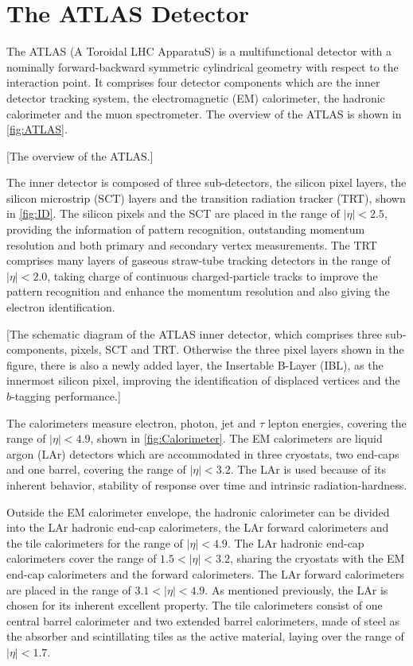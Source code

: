 \documentclass[class=NTHU_thesis, crop=false]{standalone}
\begin{document}
\chapter{The ATLAS Detector}
The ATLAS (A Toroidal LHC ApparatuS)\cite{1748-0221-3-08-S08003} is a multifunctional detector with a nominally forward-backward symmetric cylindrical geometry with respect to the interaction point. It comprises four detector components which are the inner detector tracking system, the electromagnetic (EM) calorimeter, the hadronic calorimeter and the muon spectrometer. The overview of the ATLAS is shown in \cref{fig:ATLAS}.

[The overview of the ATLAS.]

The inner detector is composed of three sub-detectors, the silicon pixel layers, the silicon microstrip (SCT) layers and the transition radiation tracker (TRT), shown in \cref{fig:ID}. The silicon pixels and the SCT are placed in the range of $\left|\eta\right| < 2.5$, providing the information of pattern recognition, outstanding momentum resolution and both primary and secondary vertex measurements. The TRT comprises many layers of gaseous straw-tube tracking detectors in the range of $\left|\eta\right| < 2.0$, taking charge of continuous charged-particle tracks to improve the pattern recognition and enhance the momentum resolution and also giving the electron identification.

[The schematic diagram of the ATLAS inner detector, which comprises three sub-components, pixels, SCT and TRT. Otherwise the three pixel layers shown in the figure, there is also a newly added layer, the Insertable B-Layer (IBL)\cite{Capeans:1291633}\cite{CERN-LHCC-2012-009}, as the innermost silicon pixel, improving the identification of displaced vertices and the $b$-tagging performance.]

The calorimeters measure electron, photon, jet and $\tau$ lepton energies, covering the range of $\left|\eta\right| < 4.9$, shown in \cref{fig:Calorimeter}. The EM calorimeters are liquid argon (LAr) detectors which are accommodated in three cryostats, two end-caps and one barrel, covering the range of $\left|\eta\right| < 3.2$. The LAr is used because of its inherent behavior, stability of response over time and intrinsic radiation-hardness.

Outside the EM calorimeter envelope, the hadronic calorimeter can be divided into the LAr hadronic end-cap calorimeters, the LAr forward calorimeters and the tile calorimeters for the range of $\left|\eta\right| < 4.9$. The LAr hadronic end-cap calorimeters cover the range of $1.5 < \left|\eta\right| < 3.2$, sharing the cryostats with the EM end-cap calorimeters and the forward calorimeters. The LAr forward calorimeters are placed in the range of $3.1 < \left|\eta\right| < 4.9$. As mentioned previously, the LAr is chosen for its inherent excellent property. The tile calorimeters consist of one central barrel calorimeter and two extended barrel calorimeters, made of steel as the absorber and scintillating tiles as the active material, laying over the range of $\left|\eta\right| < 1.7$.
\end{document}
